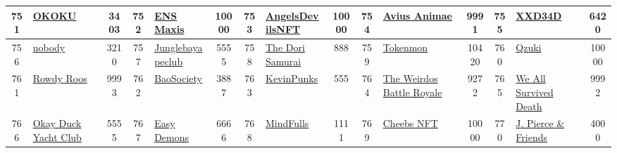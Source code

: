 \begin{table*}[]
{\begin{tabular}{|c|l|c|c|l|c|c|l|c|c|l|c|c|l|c|}
        751   & \href{https://opensea.io/collection/okokuofficial}{OKOKU}                          & 3403              & 752   & \href{https://ensmaxis.com}{ENS Maxis}                                                            & 10000             & 753   & \href{https://angelsdevilsnft.com/}{AngelsDevilsNFT}                              & 10000             & 754   & \href{https://www.aviusanimae.xyz/}{Avius Animae}                             & 9991              & 755   & \href{https://xxdead.xyz/}{XXD34D}                                                        & 6420                                    \\ \hline
        756   & \href{https://nobodyeth.art}{nobody}                                               & 3210              & 757   & \href{https://junglebayapeclub.com/}{Junglebayapeclub}                                            & 5555              & 758   & \href{https://www.houseofdori.com/}{The Dori Samurai}                             & 888               & 759   & \href{https://www.tokenmon.com/}{Tokenmon}                                    & 10420             & 760   & \href{https://qzuki.com}{Qzuki}                                                           & 10000                                   \\ \hline
        761   & \href{https://www.rowdyroos.com}{Rowdy Roos}                                       & 9993              & 762   & \href{https://www.baosociety.com/}{BaoSociety}                                                    & 3887              & 763   & \href{https://opensea.io/collection/kevinpunks}{KevinPunks}                       & 555               & 764   & \href{https://theweirdos.com/}{The Weirdos Battle Royale}                     & 9272              & 765   & \href{http://www.wasdnft.com}{We All Survived Death}                                      & 9992                                    \\ \hline
        766   & \href{https://www.okayduckyachtclub.xyz/stake}{Okay Duck Yacht Club}               & 5555              & 767   & \href{http://easydemonsclub.io}{Easy Demons}                                                      & 6666              & 768   & \href{http://mindfulls.art}{MindFulls}                                            & 1111              & 769   & \href{https://linktr.ee/OfficialCheebsNFT}{Cheebs NFT}                        & 10000             & 770   & \href{https://ownerfy.com/jpandfriends}{J. Pierce \& Friends}                             & 4000                                    \\ \hline

\end{tabular}}
\end{table*}
